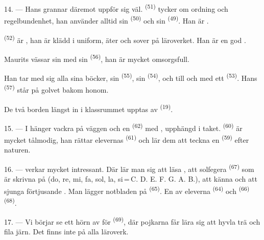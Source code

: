 14. --- Hans grannar däremot uppför sig väl.  \textsuperscript{(51)} tycker om
ordning och regelbundenhet, han använder alltid sin  \textsuperscript{(50)} och
sin  \textsuperscript{(49)}. Han är .

 \textsuperscript{(52)} är , han är klädd i
uniform, äter och sover på läroverket. Han är en god .

Maurits vässar sin  med sin  \textsuperscript{(56)}, han
är mycket omsorgsfull.

Han tar med sig alla sina böcker, sin  \textsuperscript{(55)}, sin
 \textsuperscript{(54)}, och till och med ett 
\textsuperscript{(53)}. Hans
 \textsuperscript{(57)} står på golvet bakom honom.

De två borden längst in i klassrummet upptas av  \textsuperscript{(19)}.

\VUsaut{4.6mm}
\VUsaut{3.4mm}

15. --- I  hänger vackra  på väggen och en
 \textsuperscript{(62)} med , upphängd i taket.
 \textsuperscript{(60)} är mycket tålmodig, han rättar elevernas
 \textsuperscript{(61)} och lär dem att teckna en
 \textsuperscript{(59)} efter naturen.

16. ---  verkar mycket intressant. Där lär man sig att läsa
, att solfegera  \textsuperscript{(67)} som
är skrivna på  (do, re, mi, fa, sol, la, si\,=\,C. D. E. F. G. A. B.), att
känna  och att sjunga förtjusande
. Man lägger notbladen på 
\textsuperscript{(65)}. En av eleverna  \textsuperscript{(64)} och
 \textsuperscript{(66)}
 \textsuperscript{(68)}.

17. --- Vi börjar se ett hörn av  för 
\textsuperscript{(69)}, där pojkarna får lära sig att hyvla trä och fila järn. Det finns inte
på alla läroverk.

\VUsaut{5.0mm}
\VUsaut{3.6mm}

